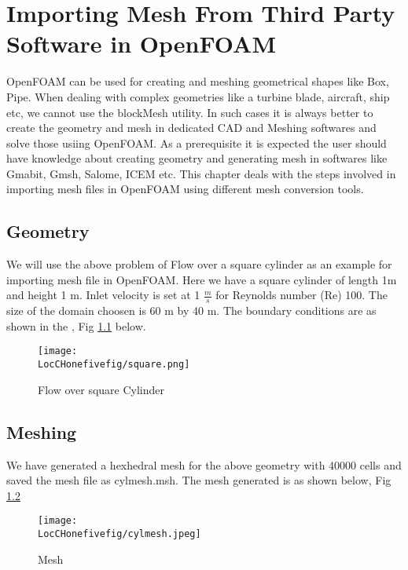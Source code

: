 \chapter{Importing Mesh From Third Party Software in OpenFOAM}
\thispagestyle{empty}
\label{sec:chap15}
\newcommand{\LocCHonefivefig}{\Origin/CHAPTERS/chap15/figures}

OpenFOAM can be used for creating and meshing geometrical shapes like Box, Pipe. When dealing with complex geometries like a turbine blade, aircraft,
ship etc, we cannot use the blockMesh utility. In such cases it is always better to create the geometry and mesh in dedicated CAD and Meshing softwares 
and solve those usiing OpenFOAM. As a prerequisite it is expected the user should have knowledge about creating geometry and generating mesh in softwares
like Gmabit, Gmsh, Salome, ICEM etc. This chapter deals with the steps involved in importing mesh files in OpenFOAM using different mesh conversion tools.

\section{Geometry}

We will use the above problem of Flow over a square cylinder as an example for importing mesh file in OpenFOAM. Here we have a square cylinder
of length 1m and height 1 m. Inlet velocity is set at 1 $\frac{m}{s}$ for Reynolds number (Re) 100. The size of the domain choosen is 60 m by 40 m.
The boundary conditions are as shown in the , Fig \ref{square} below.

\begin{figure}[t]  
\centering  
\texttt{[image: \\LocCHonefivefig/square.png]}
\caption{Flow over square Cylinder}
\label{square}  
\end{figure}

\section{Meshing}

We have generated a hexhedral mesh for the above geometry with 40000 cells and saved the mesh file as cylmesh.msh. 
The mesh generated is as shown below, Fig \ref{mesh} 

\begin{figure}[h]  
\centering
\texttt{[image: \\LocCHonefivefig/cylmesh.jpeg]}
\caption{Mesh}
\label{mesh}
  
\end{figure}

